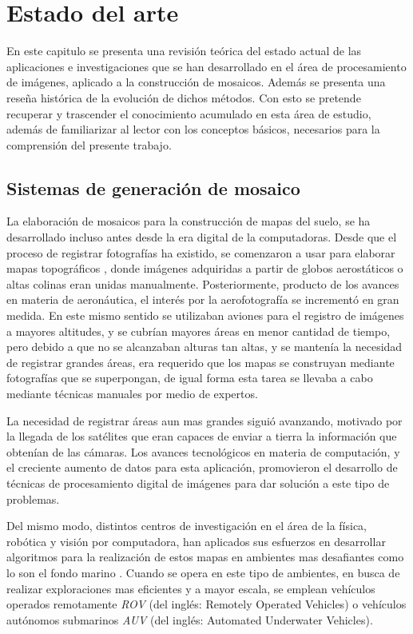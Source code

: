 \chapter{Estado del arte}
\label{capitulo2}

En este capitulo se presenta una revisión teórica del estado actual de las aplicaciones e investigaciones que se han desarrollado en el área de procesamiento de imágenes, aplicado a la construcción de mosaicos. Además se presenta una reseña histórica de la evolución de dichos métodos. Con esto se pretende recuperar y trascender el conocimiento acumulado en esta área de estudio, además de familiarizar al lector con los conceptos básicos, necesarios para la comprensión del presente trabajo.

\section{Sistemas de generación de mosaico}

La elaboración de mosaicos para la construcción de mapas del suelo, se ha desarrollado incluso antes desde la era digital de la computadoras. Desde que el proceso de registrar fotografías ha existido, se comenzaron a usar para elaborar mapas topográficos \cite{primeros-mapas}, donde imágenes adquiridas a partir de globos aerostáticos o altas colinas eran unidas manualmente. Posteriormente, producto de los avances en materia de aeronáutica, el interés por la aerofotografía se incrementó en gran medida. En este mismo sentido se utilizaban aviones para el registro de imágenes a mayores altitudes, y se cubrían mayores áreas en menor cantidad de tiempo, pero debido a que no se alcanzaban alturas tan altas, y se mantenía la necesidad de registrar grandes áreas, era requerido que los mapas se construyan mediante fotografías que se superpongan, de igual forma esta tarea se llevaba a cabo mediante técnicas manuales por medio de expertos.

La necesidad de registrar áreas aun mas grandes siguió avanzando, motivado por la llegada de los satélites que eran capaces de enviar a tierra la información que obtenían de las cámaras. Los avances tecnológicos en materia de computación, y el creciente aumento de datos para esta aplicación, promovieron el desarrollo de técnicas de procesamiento digital de imágenes para dar solución a este tipo de problemas.

Del mismo modo, distintos centros de investigación en el área de la física, robótica y visión por computadora, han aplicados sus esfuerzos en desarrollar algoritmos para la realización de estos mapas en ambientes mas desafiantes como lo son el fondo marino \cite{gracias-victor,Pizarro-singh,eustice,Allais}. Cuando se opera en este tipo de ambientes, en busca de realizar exploraciones mas eficientes y a mayor escala, se emplean vehículos operados remotamente \textit{ROV} (del inglés: Remotely Operated Vehicles) o vehículos autónomos submarinos \textit{AUV} (del inglés: Automated Underwater Vehicles).
